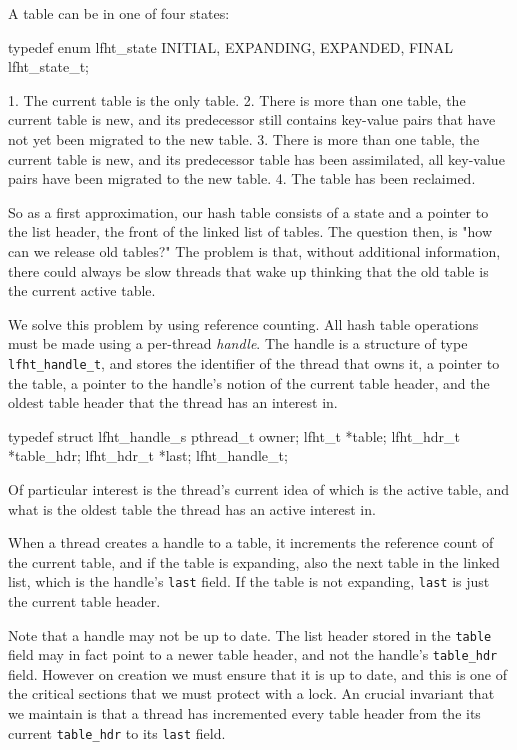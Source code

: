 A table can be in one of four states:

\begin{center}
\begin{clisting}
typedef enum lfht_state { INITIAL, EXPANDING, EXPANDED, FINAL } lfht_state_t;
\end{clisting}
\end{center}

1. The current table is the only table. 2. There is more than one table, the current table is new, and its
predecessor still contains key-value pairs that have not yet been
migrated to the new table. 3. There is more than one table, the current table is new, and its
predecessor table has been assimilated, all key-value pairs have been
migrated to the new table. 4. The table has been reclaimed.

So as a first approximation, our hash table consists of a state and a
pointer to the list header, the front of the linked list of tables.
The question then, is "how can we release old tables?" The problem is
that, without additional information, there could always be slow
threads that wake up thinking that the old table is the current active
table.

We solve this problem by using reference counting.
All hash table operations must be made using a per-thread {\em handle\/}. The handle is  a
structure of type \texttt{lfht\_handle\_t}, and stores
the identifier of the thread that owns it, a pointer to the table, a pointer to the handle's notion
of the current table header, and the oldest table header that the thread has an interest in.

\begin{center}
\begin{clisting}
typedef struct lfht_handle_s {
  pthread_t owner;
  lfht_t *table;
  lfht_hdr_t *table_hdr;
  lfht_hdr_t *last;  
} lfht_handle_t;
\end{clisting}
\end{center}

Of particular interest is the thread's current idea of which
is the active table, and what is the oldest table the thread has
an active interest in.


When a thread creates a handle to a table, it increments the reference
count of the current table, and if the table is expanding, also the
next table in the linked list, which is the handle's \texttt{last} field.  If
the table is not expanding, \texttt{last} is just the current table header.

Note that a handle may not be up to date. The list
header stored in the \texttt{table} field may in fact point to a newer table header,
and not the handle's \texttt{table\_hdr}
field. However on creation we must ensure that it is up to date, and
this is one of the critical sections that we must protect with a lock.
An crucial invariant that we maintain is that a thread has incremented
every table header from the its current \texttt{table\_hdr} to its \texttt{last}
field.

